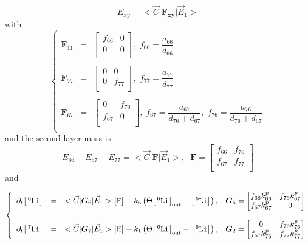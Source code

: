 \documentclass[aps,onecolumn,11pt]{revtex4}
\newcommand{\mychem}[1]{\mathtt{#1}}
\newcommand{\myconc}[1]{\big[#1\big]}
\newcommand{\spLi}[1]{{\!~^{#1}\mychem{Li}}}
\newcommand{\Li}[1]{\myconc{\spLi{#1}}}
\newcommand{\spproton}{\mychem{H}}
\newcommand{\proton}{\myconc{\spproton}}
\newcommand{\myout}[1]{{#1}_{\tiny\mathrm{out}}}
\newcommand{\LiOut}[1]{\myout{\Li{#1}}}
\newcommand{\mymat}[1]{{\bm{#1}}}
\begin{document}
\begin{equation}
\boxed{
E_{xy} = <{\vec{C}} \vert \mymat{F_{xy}} \vert \vec{E}_1 >
}
\end{equation}
with
\begin{equation}
\left\lbrace
\begin{array}{rcl}
\mymat{F}_{11} & = & 
\begin{bmatrix}
	f_{66} & 0 \\
	0 & 0\\
\end{bmatrix}, \; f_{66} = \dfrac{a_{66}}{d_{66}}\\
\\
\mymat{F}_{77} & = & 
\begin{bmatrix}
	0 & 0 \\
	0 & f_{77}\\
\end{bmatrix}, \; f_{77} = \dfrac{a_{77}}{d_{77}}\\
\\
\mymat{F}_{67} & = & 
\begin{bmatrix}
	0 & f_{76}\\
	f_{67} & 0\\
\end{bmatrix}, \; f_{67} = \dfrac{a_{67}}{d_{76}+d_{67}},\; f_{76} = \dfrac{a_{76}}{d_{76}+d_{67}}\\
\end{array}
\right.
\end{equation}
and the second layer mass is
\begin{equation}
E_{66} + E_{67} + E_{77} = <{\vec{C}} \vert \mymat{F} \vert \vec{E}_1 >, \;\;
 \mymat{F} 
 = \begin{bmatrix}
	f_{66} & f_{76}\\
	f_{67} & f_{77}\\
\end{bmatrix}
\end{equation}
and


\begin{equation}
\left\lbrace
\begin{array}{rcll}
	\partial_t \Li{6} & = & <\vec{C}|\mymat{G}_6|\vec{E}_1> \proton+ k_6\left(\Theta \LiOut{6} - \Li{6}\right), &
	\mymat{G}_6 = 
	\begin{bmatrix}
	f_{66}k^p_{66} & f_{76} k^p_{67} \\
	f_{67}k^p_{67} & 0 \\
	\end{bmatrix}
	\\
	\\
	\partial_t \Li{7} & = & <\vec{C}|\mymat{G}_7|\vec{E}_1> \proton + k_1\left(\Theta \LiOut{6} - \Li{6}\right), &
	\mymat{G}_2 = 
	\begin{bmatrix}
	0              & f_{76} k^p_{76}\\
	f_{67}k^p_{76} & f_{77}k^p_{77}\\
	\end{bmatrix}
	\\
\end{array}
\right.
\end{equation}
\end{document}
